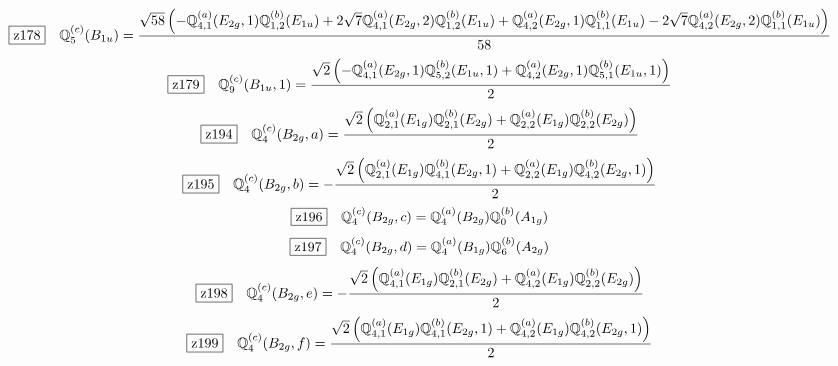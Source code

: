 \documentclass[fleqn,10pt,landscape]{jsarticle}
\begin{document}
\begin{dmath*}
\hspace*{3mm}\fbox{z178}\quad \mathbb{Q}_{5}^{(c)}(B_{1u})=\frac{\sqrt{58} \left(- \mathbb{Q}_{4,1}^{(a)}(E_{2g},1) \mathbb{Q}_{1,2}^{(b)}(E_{1u}) + 2 \sqrt{7} \mathbb{Q}_{4,1}^{(a)}(E_{2g},2) \mathbb{Q}_{1,2}^{(b)}(E_{1u}) + \mathbb{Q}_{4,2}^{(a)}(E_{2g},1) \mathbb{Q}_{1,1}^{(b)}(E_{1u}) - 2 \sqrt{7} \mathbb{Q}_{4,2}^{(a)}(E_{2g},2) \mathbb{Q}_{1,1}^{(b)}(E_{1u})\right)}{58}
\end{dmath*}
\begin{dmath*}
\hspace*{3mm}\fbox{z179}\quad \mathbb{Q}_{9}^{(c)}(B_{1u},1)=\frac{\sqrt{2} \left(- \mathbb{Q}_{4,1}^{(a)}(E_{2g},1) \mathbb{Q}_{5,2}^{(b)}(E_{1u},1) + \mathbb{Q}_{4,2}^{(a)}(E_{2g},1) \mathbb{Q}_{5,1}^{(b)}(E_{1u},1)\right)}{2}
\end{dmath*}
\begin{dmath*}
\hspace*{3mm}\fbox{z194}\quad \mathbb{Q}_{4}^{(c)}(B_{2g},a)=\frac{\sqrt{2} \left(\mathbb{Q}_{2,1}^{(a)}(E_{1g}) \mathbb{Q}_{2,1}^{(b)}(E_{2g}) + \mathbb{Q}_{2,2}^{(a)}(E_{1g}) \mathbb{Q}_{2,2}^{(b)}(E_{2g})\right)}{2}
\end{dmath*}
\begin{dmath*}
\hspace*{3mm}\fbox{z195}\quad \mathbb{Q}_{4}^{(c)}(B_{2g},b)=- \frac{\sqrt{2} \left(\mathbb{Q}_{2,1}^{(a)}(E_{1g}) \mathbb{Q}_{4,1}^{(b)}(E_{2g},1) + \mathbb{Q}_{2,2}^{(a)}(E_{1g}) \mathbb{Q}_{4,2}^{(b)}(E_{2g},1)\right)}{2}
\end{dmath*}
\begin{dmath*}
\hspace*{3mm}\fbox{z196}\quad \mathbb{Q}_{4}^{(c)}(B_{2g},c)=\mathbb{Q}_{4}^{(a)}(B_{2g}) \mathbb{Q}_{0}^{(b)}(A_{1g})
\end{dmath*}
\begin{dmath*}
\hspace*{3mm}\fbox{z197}\quad \mathbb{Q}_{4}^{(c)}(B_{2g},d)=\mathbb{Q}_{4}^{(a)}(B_{1g}) \mathbb{Q}_{6}^{(b)}(A_{2g})
\end{dmath*}
\begin{dmath*}
\hspace*{3mm}\fbox{z198}\quad \mathbb{Q}_{4}^{(c)}(B_{2g},e)=- \frac{\sqrt{2} \left(\mathbb{Q}_{4,1}^{(a)}(E_{1g}) \mathbb{Q}_{2,1}^{(b)}(E_{2g}) + \mathbb{Q}_{4,2}^{(a)}(E_{1g}) \mathbb{Q}_{2,2}^{(b)}(E_{2g})\right)}{2}
\end{dmath*}
\begin{dmath*}
\hspace*{3mm}\fbox{z199}\quad \mathbb{Q}_{4}^{(c)}(B_{2g},f)=\frac{\sqrt{2} \left(\mathbb{Q}_{4,1}^{(a)}(E_{1g}) \mathbb{Q}_{4,1}^{(b)}(E_{2g},1) + \mathbb{Q}_{4,2}^{(a)}(E_{1g}) \mathbb{Q}_{4,2}^{(b)}(E_{2g},1)\right)}{2}
\end{dmath*}
\end{document}
